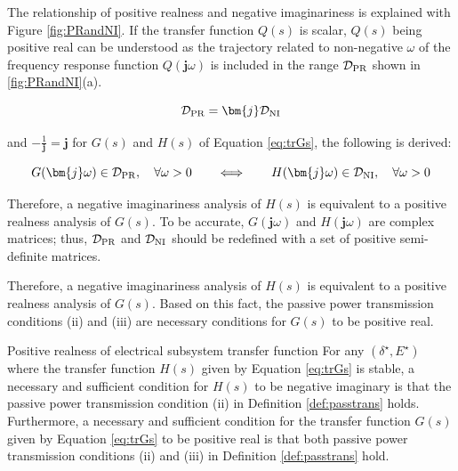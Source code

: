 \documentclass[graybox, envcountchap]{svmult}
\begin{document}
The relationship of positive realness and negative imaginariness is explained
with Figure \ref{fig:PRandNI}. If the transfer function $Q(s)$ is scalar,
$Q(s)$ being positive real can be understood as the trajectory related to
non-negative $\omega$ of the frequency response function $Q(\bm{j} \omega)$ is
included in the range $\mathcal{D}_{\rm PR}$ shown in \ref{fig:PRandNI}(a).

\[
  \mathcal{D}_{\rm PR} = \bm{j} \mathcal{D}_{\rm NI}
\]

and $-\tfrac{1}{\bm{j}}=\bm{j}$ for $G(s)$ and $H(s)$ of Equation \ref{eq:trGs},
the following is derived:

\[
  G(\bm{j} \omega) \in \mathcal{D}_{\rm PR}, 
  \quad \forall \omega >0
  \qquad
  \Longleftrightarrow
  \qquad
  H(\bm{j} \omega) \in \mathcal{D}_{\rm NI} ,
  \quad \forall \omega >0
\]

Therefore, a negative imaginariness analysis of $H(s)$ is equivalent to a
positive realness analysis of $G(s)$. To be accurate, $G(\bm{j} \omega)$ and
$H(\bm{j} \omega)$ are complex matrices; thus, $\mathcal{D}_{\rm PR}$ and
$\mathcal{D}_{\rm NI}$ should be redefined with a set of positive semi-definite
matrices.

Therefore, a negative imaginariness analysis of $H(s)$ is equivalent to a
positive realness analysis of $G(s)$. Based on this fact, the passive power
transmission conditions (ii) and (iii) are necessary conditions for $G(s)$ to be
positive real.

\begin{theorem}{Positive realness of electrical subsystem transfer function}
\label{thm:EdynNI}
For any $(\delta^{\star},E^{\star})$ where the transfer function $H(s)$ given by
Equation \ref{eq:trGs} is stable, a necessary and sufficient condition for
$H(s)$ to be negative imaginary is that the passive power transmission condition
(ii) in Definition \ref{def:passtrans} holds. Furthermore, a necessary and
sufficient condition for the transfer function $G(s)$ given by Equation
\ref{eq:trGs} to be positive real is that both passive power transmission
conditions (ii) and (iii) in Definition \ref{def:passtrans} hold.
\end{theorem}
\end{document}
